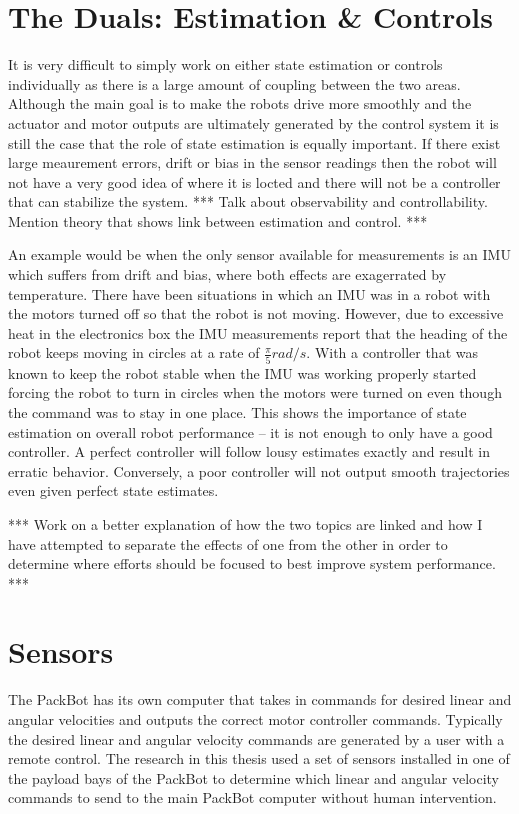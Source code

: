 \section{The Duals: Estimation \& Controls}
\label{sec:duals}
It is very difficult to simply work on either state estimation or controls individually as there is a large amount of coupling between the two areas. Although the main goal is to make the robots drive more smoothly and the actuator and motor outputs are ultimately generated by the control system it is still the case that the role of state estimation is equally important. If there exist large meaurement errors, drift or bias in the sensor readings then the robot will not have a very good idea of where it is locted and there will not be a controller that can stabilize the system. *** Talk about observability and controllability. Mention theory that shows link between estimation and control. ***

An example would be when the only sensor available for measurements is an IMU which suffers from drift and bias, where both effects are exagerrated by temperature. There have been situations in which an IMU was in a robot with the motors turned off so that the robot is not moving. However, due to excessive heat in the electronics box the IMU measurements report that the heading of the robot keeps moving in circles at a rate of $\frac{\pi}{5} rad/s$. With a controller that was known to keep the robot stable when the IMU was working properly started forcing the robot to turn in circles when the motors were turned on even though the command was to stay in one place. This shows the importance of state estimation on overall robot performance -- it is not enough to only have a good controller. A perfect controller will follow lousy estimates exactly and result in erratic behavior. Conversely, a poor controller will not output smooth trajectories even given perfect state estimates.

*** Work on a better explanation of how the two topics are linked and how I have attempted to separate the effects of one from the other in order to determine where efforts should be focused to best improve system performance. ***

\section{Sensors}
\label{sec:bgSensors}
The PackBot has its own computer that takes in commands for desired linear and angular velocities and outputs the correct motor controller commands. Typically the desired linear and angular velocity commands are generated by a user with a remote control. The research in this thesis used a set of sensors installed in one of the payload bays of the PackBot to determine which linear and angular velocity commands to send to the main PackBot computer without human intervention.

